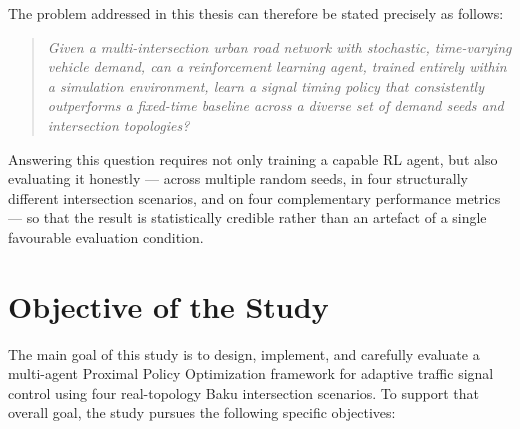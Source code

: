 \documentclass[12pt,oneside,a4paper]{report}
\begin{document}
The problem addressed in this thesis can therefore be stated
precisely as follows:

\begin{quote}
\textit{Given a multi-intersection urban road network with stochastic,
time-varying vehicle demand, can a reinforcement learning agent, trained
entirely within a simulation environment, learn a signal timing policy
that consistently outperforms a fixed-time baseline across a diverse
set of demand seeds and intersection topologies?}
\end{quote}

Answering this question requires not only training a capable RL agent,
but also evaluating it honestly --- across multiple random seeds,
in four structurally different intersection scenarios, and on four
complementary performance metrics --- so that the result is
statistically credible rather than an artefact of a single
favourable evaluation condition.

\section{Objective of the Study}
\label{sec:obj}

The main goal of this study is to design, implement, and carefully
evaluate a multi-agent Proximal Policy Optimization framework for
adaptive traffic signal control using four real-topology Baku
intersection scenarios. To support that overall goal, the study
pursues the following specific objectives:
\end{document}
